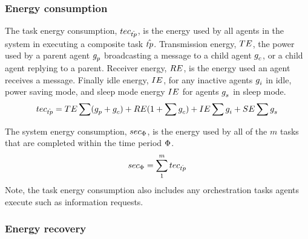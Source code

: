 \subsubsection{Energy consumption}

\begin{definition}
	The task energy consumption, $tec_{\hat{tp}}$, is the energy used by all agents in the system in executing a composite task $\hat{tp}$. Transmission energy, $TE$, the power used by a parent agent $g_{p}^{}$ broadcasting a message to a child agent $g_{c}^{}$, or a child agent replying to a parent. Receiver energy, $RE$, is the energy used an agent receives a message. Finally idle energy, $IE$, for any inactive agents $g_{i}^{}$ in idle, power saving mode, and sleep mode energy $IE$ for agents $g_{s}^{}$ in sleep mode.
   	\begin{equation}
   		tec_{\hat{tp}} 
   		= TE \sum (g_{p}^{} + g_{c}^{})
   		+ RE (1 + \sum g_{c}^{})
   		+ IE \sum g_{i}^{}
   		+ SE \sum g_{s}^{}
   	\end{equation}
\end{definition}



\begin{definition}
	The system energy consumption, $sec_{\Phi}$, is the energy used by all of the $m$ tasks that are completed within the time period $\Phi$.
	\begin{equation}
		sec_{\Phi} 
		= \sum_{1}^{m} tec_{\hat{tp}}
	\end{equation}
	Note, the task energy consumption also includes any orchestration tasks agents execute such as information requests.
\end{definition}

\subsubsection{Energy recovery}

\newcommand{\setEnergyDeltaIdle}[2]{\Delta\setSymbol{E}{\texttt{idle}}{#2}}
\newcommand{\setEnergyHarvest}[2]{\setSymbol{E}{\texttt{harvest}}{#2}}
\newcommand{\setEnergyWUR}[2]{\setSymbol{E}{\texttt{idle-wur}}{#2}}

